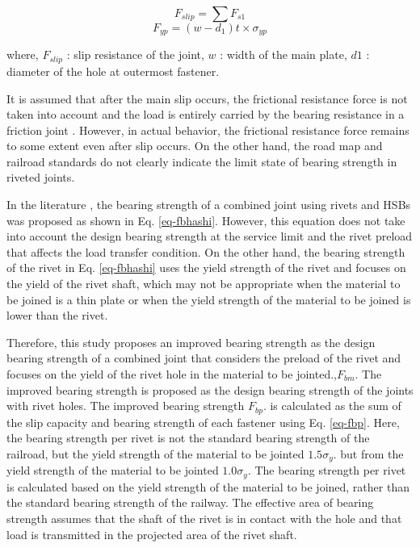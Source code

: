 \begin{equation}\label{fslip-ch4}
    F_{slip} = \sum F_{s1}
\end{equation}
\begin{equation}\label{fyp-ch4}
    F_{yp} = (w-d_1)t\times \sigma_{yp}
\end{equation}

where, $F_{slip}$ : slip resistance of the joint, $w$ : width of the main plate, $d1$ : diameter of the hole at outermost fastener.

It is assumed that after the main slip occurs, the frictional resistance force is not taken into account and the load is entirely carried by the bearing resistance in a friction joint \cite{rivet1977}. However, in actual behavior, the frictional resistance force remains to some extent even after slip occurs. On the other hand, the road map and railroad standards do not clearly indicate the limit state of bearing strength in riveted joints.

In the literature \cite{hashimoto2008}, the bearing strength of a combined joint using rivets and \ac{HSB}s was proposed as shown in Eq. \ref{eq-fbhashi}. However, this equation does not take into account the design bearing strength at the service limit and the rivet preload that affects the load transfer condition. On the other hand, the bearing strength of the rivet in Eq. \ref{eq-fbhashi} uses the yield strength of the rivet and focuses on the yield of the rivet shaft, which may not be appropriate when the material to be joined is a thin plate or when the yield strength of the material to be joined is lower than the rivet.

Therefore, this study proposes an improved bearing strength as the design bearing strength of a combined joint that considers the preload of the rivet and focuses on the yield of the rivet hole in the material to be jointed.,$F_{bm}$. The improved bearing strength is proposed as the design bearing strength of the joints with rivet holes. The improved bearing strength $F_{bp}$. is calculated as the sum of the slip capacity and bearing strength of each fastener using Eq. \ref{eq-fbp}. Here, the bearing strength per rivet is not the standard bearing strength of the railroad, but the yield strength of the material to be jointed $1.5σ_y$. but from the yield strength of the material to be jointed $1.0 σ_y$. The bearing strength per rivet is calculated based on the yield strength of the material to be joined, rather than the standard bearing strength of the railway. The effective area of bearing strength assumes that the shaft of the rivet is in contact with the hole and that load is transmitted in the projected area of the rivet shaft.


